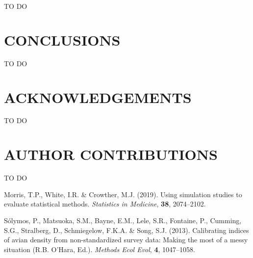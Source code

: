 \documentclass[
  11pt,
]{article}
\begin{document}
TO DO

\clearpage

\hypertarget{conclusions}{%
\section{CONCLUSIONS}\label{conclusions}}

TO DO

\clearpage

\hypertarget{acknowledgements}{%
\section{ACKNOWLEDGEMENTS}\label{acknowledgements}}

TO DO

\hypertarget{author-contributions}{%
\section{AUTHOR CONTRIBUTIONS}\label{author-contributions}}

TO DO

\hypertarget{refs}{}
\leavevmode\hypertarget{ref-morris_using_2019}{}%
Morris, T.P., White, I.R. \& Crowther, M.J. (2019). Using simulation
studies to evaluate statistical methods. \emph{Statistics in Medicine},
\textbf{38}, 2074--2102.

\leavevmode\hypertarget{ref-solymos_calibrating_2013}{}%
Sólymos, P., Matsuoka, S.M., Bayne, E.M., Lele, S.R., Fontaine, P.,
Cumming, S.G., Stralberg, D., Schmiegelow, F.K.A. \& Song, S.J. (2013).
Calibrating indices of avian density from non-standardized survey data:
Making the most of a messy situation (R.B. O'Hara, Ed.). \emph{Methods
Ecol Evol}, \textbf{4}, 1047--1058.
\end{document}
